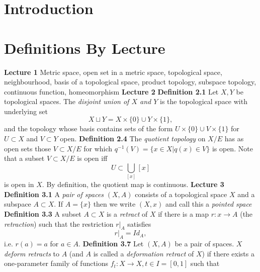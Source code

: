 \section{Introduction}
\section{Definitions By Lecture}
\textbf{Lecture 1}
\newline \newline Metric space, open set in a metric space, topological space, neighbourhood, basis of a topological space, product topology, subspace topology, continuous function, homeomorphism  
\newline \newline \textbf{Lecture 2}
\newline \newline \textbf{Definition 2.1} Let $X, Y$ be topological spaces. The \textit{disjoint union of $X$ and $Y$} is the topological space with underlying set $$X \sqcup Y = X \times \{0\} \cup Y \times \{1\},$$ and the topology whose basis contains sets of the form $U \times \{0\} \cup V \times \{1\}$ for $U \subset X$ and $V \subset Y$ open.
\newline \newline \textbf{Definition 2.4} The \textit{quotient topology} on $X/E$ has as open sets those $V \subset X/E$ for which $q^{-1}(V) = \{x \in X | q(x) \in V \}$ is open.
\newline \newline Note that a subset $V \subset X/E$ is open iff $$U \subset \bigcup_{[x]} [x]$$ is open in $X$. By definition, the quotient map is continuous.
\newline \newline \textbf{Lecture 3}
\newline \newline \textbf{Definition 3.1} A \textit{pair of spaces} $(X,A)$ consists of a topological space $X$ and a subspace $A \subset X$. If $A = \{x\}$ then we write $(X,x)$ and call this a \textit{pointed space}
\newline \newline \textbf{Definition 3.3} A subset $A \subset X$ is a \textit{retract} of $X$ if there is a map $r: x \rightarrow A$ (the \textit{retraction}) such that the restriction $r|_A$ satisfies $$ r|_A = Id_A,$$ i.e. $r(a) = a$ for $a \in A$.
\newline \newline \textbf{Definition 3.7} Let $(X,A)$ be a pair of spaces. $X$ \textit{deform retracts} to $A$ (and $A$ is called a \textit{deformation retract} of $X$) if there exists a one-parameter family of functions $f_t:X \rightarrow X, t \in I = [0,1]$ such that 
